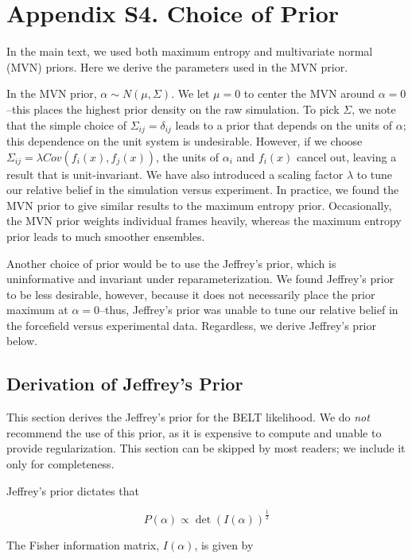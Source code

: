 \documentclass[journal=jacsat,manuscript=article]{achemso}
\begin{document}
\newpage

\section{Appendix S4.  Choice of Prior}

In the main text, we used both maximum entropy and multivariate normal (MVN) priors.  Here we derive the parameters used in the MVN prior. 

In the MVN prior, $\alpha \sim N(\mu,\Sigma)$.  We let $\mu = 0$ to center the MVN around $\alpha = 0$--this places the highest prior density on the raw simulation.  To pick $\Sigma$, we note that the simple choice of $\Sigma_{ij} = \delta_{ij}$ leads to a prior that depends on the units of $\alpha$; this dependence on the unit system is undesirable.  However, if we choose $\Sigma_{ij} = \lambda Cov(f_i(x), f_j(x))$, the units of $\alpha_i$ and $f_i(x)$ cancel out, leaving a result that is unit-invariant.  We have also introduced a scaling factor $\lambda$ to tune our relative belief in the simulation versus experiment.  In practice, we found the MVN prior to give similar results to the maximum entropy prior.  Occasionally, the MVN prior weights individual frames heavily, whereas the maximum entropy prior leads to much smoother ensembles.  

Another choice of prior would be to use the Jeffrey's prior, which is uninformative and invariant under reparameterization.  We found Jeffrey's prior to be less desirable, however, because it does not necessarily place the prior maximum at $\alpha = 0$--thus, Jeffrey's prior was unable to tune our relative belief in the forcefield versus experimental data.  Regardless, we derive Jeffrey's prior below.

\subsection{Derivation of Jeffrey's Prior}

This section derives the Jeffrey's prior for the BELT likelihood.  We do \emph{not} recommend the use of this prior, as it is expensive to compute and unable to provide regularization.  This section can be skipped by most readers; we include it only for completeness.

Jeffrey's prior dictates that 

$$P(\alpha) \propto \det(I(\alpha))^\frac{1}{2}$$

The Fisher information matrix, $I(\alpha)$, is given by
\end{document}
